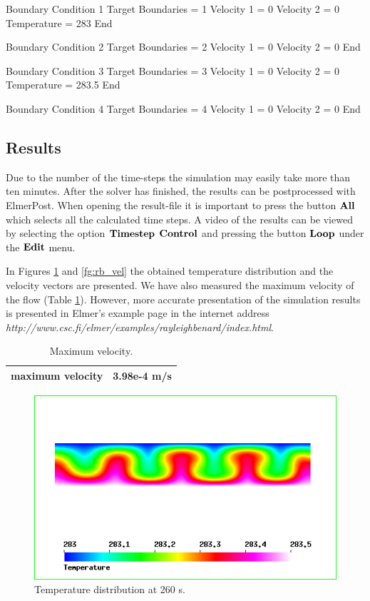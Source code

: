 \begin{flushleft}
\ttbegin
Boundary Condition 1
  Target Boundaries = 1
  Velocity 1 = 0
  Velocity 2 = 0
  Temperature = 283
End

Boundary Condition 2
  Target Boundaries = 2
  Velocity 1 = 0
  Velocity 2 = 0
End

Boundary Condition 3
  Target Boundaries = 3
  Velocity 1 = 0
  Velocity 2 = 0
  Temperature = 283.5
End

Boundary Condition 4
  Target Boundaries = 4
  Velocity 1 = 0
  Velocity 2 = 0
End
\ttend


\subsection*{Results}

Due to the number of the time-steps the simulation may easily take more than ten minutes.
After the solver has finished, the results can be postprocessed with ElmerPost.
When opening the result-file it is important to press the button $\bf{All}$ which selects all the calculated time steps.
A video of the results can be viewed by selecting the option $\bf{Timestep}$ 
$\bf{Control}$ and pressing the button $\bf{Loop}$ under the $\bf{Edit}$ menu.


In Figures \ref{fg:rb_temp} and \ref{fg:rb_vel} the obtained temperature distribution and the velocity vectors are presented. We have also measured the maximum velocity of the flow (Table \ref{tb:maxvel}).
However, more accurate presentation of the simulation results is presented in Elmer's example page in the internet address
\emph{http://www.csc.fi/elmer/examples/rayleighbenard/index.html}.
\end{flushleft}

\begin{table}[h]
\caption{Maximum velocity.}
\label{tb:maxvel}
\begin{center}
\begin{tabular}{ll} \hline
maximum velocity  & 3.98e-4 m/s \\ \hline
\end{tabular}
\end{center}
\end{table}

\begin{figure}[h]
\centering
\includegraphics[width=150 mm, height=50 mm]{rb_temp}
\caption{Temperature distribution at 260 s.}\label{fg:rb_temp}
\end{figure} 

